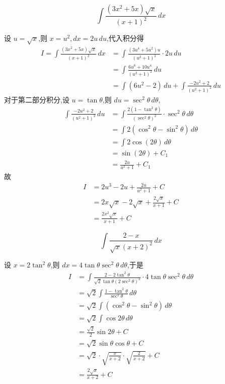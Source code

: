 \begin{questions}
    \question
    \[
    \int \frac{(3x^2+5x)\sqrt{x}}{(x+1)^2} \, dx
    \]
    \begin{solution}
        设 $u = \sqrt{x}$,则 $x = u^2, dx = 2u \, du$,代入积分得
        \begin{align*}
        I = \int \frac{(3x^2+5x)\sqrt{x}}{(x+1)^2} \, dx
        &= \int \frac{(3u^4+5u^2)u}{(u^2+1)^2} \cdot 2u \, du \\
        &= \int \frac{6u^6+10u^4}{(u^2+1)^2} \, du \\
        &= \int (6u^2 - 2) \, du + \int \frac{-2u^2 + 2}{(u^2+1)^2} \, du
        \end{align*}
        对于第二部分积分,设 $u = \tan\theta$,则 $du = \sec^2\theta \, d\theta$,
        \begin{align*}
        \int \frac{-2u^2 + 2}{(u^2+1)^2} \, du &= \int \frac{2(1 - \tan^2\theta)}{(\sec^2\theta)^2} \cdot \sec^2\theta \, d\theta \\
        &= \int 2(\cos^2\theta - \sin^2\theta) \, d\theta \\
        &= \int 2\cos(2\theta) \, d\theta \\
        &= \sin(2\theta) + C_1 \\
        &= \frac{2u}{u^2+1} + C_1
        \end{align*}
        故
        \begin{align*}
        I &= 2u^3 - 2u + \frac{2u}{u^2+1} + C \\
        &= 2x\sqrt{x} - 2\sqrt{x} + \frac{2\sqrt{x}}{x+1} + C \\
        &= \frac{2x^2\sqrt{x}}{x+1} + C
        \end{align*}
    \end{solution}

    \question
    \[
    \int \frac{2-x}{\sqrt{x}(x+2)^2} \, dx
    \]
    \begin{solution}
        设 $x = 2\tan^2\theta$,则 $dx = 4\tan\theta \sec^2\theta \, d\theta$,于是
        \begin{align*}
        I &= \int \frac{2-2\tan^2\theta}{\sqrt{2}\tan\theta (2\sec^2\theta)^2} \cdot 4\tan\theta \sec^2\theta \, d\theta \\
        &= \sqrt{2} \int \frac{1-\tan^2\theta}{\sec^2\theta} \, d\theta \\
        &= \sqrt{2} \int (\cos^2\theta - \sin^2\theta) \, d\theta \\
        &= \sqrt{2} \int \cos 2\theta \, d\theta \\
        &= \frac{\sqrt{2}}{2} \sin 2\theta + C \\
        &= \sqrt{2} \sin\theta \cos\theta + C \\
        &= \sqrt{2} \cdot \sqrt{\frac{x}{x+2}} \cdot \sqrt{\frac{2}{x+2}}  + C \\
        &= \frac{2\sqrt{x}}{x+2} + C
        \end{align*}
    \end{solution}


\end{questions}
